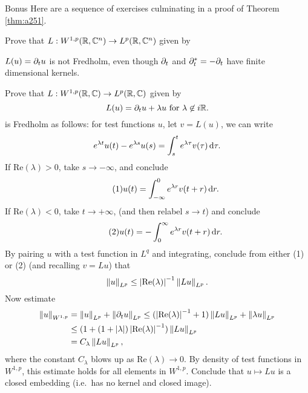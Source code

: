 \documentclass{amsart}
\begin{document}
\begin{clear}{Bonus}
Here are a sequence of exercises culminating in a proof of Theorem \ref{thm:a251}.

\begin{xca}
  Prove that $L:W^{1,p}(\mathbb{R},\mathbb{C}^{n})\to L^{p}(\mathbb{R},\mathbb{C}^{n})$ given by

  $L(u)=\partial_{t}u$ is not Fredholm, even though $\partial_{t}$ and
  $\partial_{t}^{*}=-\partial_{t}$ have finite dimensional kernels. 
\end{xca}
\begin{xca}\label{xca:a252}
  Prove that $L:W^{1,p}(\mathbb{R},\mathbb{C})\to L^{p}(\mathbb{R},\mathbb{C})$ given by
  \begin{equation*}
    L(u)=\partial_{t}u+\lambda u\text{ for $\lambda\not\in i\mathbb{R}$}.
  \end{equation*}
  is Fredholm as follows: for test functions $u$, let $v=L(u)$, we can write
  \begin{equation*}
    e^{\lambda t}u(t)-e^{\lambda s}u(s)=\int_{s}^{t}e^{\lambda
      \tau}v(\tau)\,\mathrm{d} \tau.
  \end{equation*}
  If $\text{Re}(\lambda)>0$, take $s\to -\infty$, and conclude
  \begin{equation*}\tag{$1$}
    u(t)=\int_{-\infty}^{0}e^{\lambda r}v(t+r)\,\mathrm{d} r.
  \end{equation*}
  If $\text{Re}(\lambda)<0$, take $t\to+\infty$, (and then relabel $s\to t$) and conclude
  \begin{equation*}\tag{$2$}
    u(t)=-\int_{0}^{\infty}e^{\lambda r}v(t+r)\,\mathrm{d} r.
  \end{equation*}
  By pairing $u$ with a test function in $L^{q}$ and integrating,
  conclude from either (1) or (2) (and recalling $v=Lu$) that
  \begin{equation*}
    \left\lVert u\right\rVert_{L^{p}}\le \left|\text{Re}(\lambda)\right|^{-1}\left\lVert Lu\right\rVert_{L^{p}}.
  \end{equation*}
  Now estimate
  \begin{equation*}
    \begin{aligned}
      \left\lVert u\right\rVert_{W^{1,p}}&=\left\lVert u\right\rVert_{L^{p}}+\left\lVert\partial_{t}u\right\rVert_{L^{p}}\le
      (\left|\text{Re}(\lambda)\right|^{-1}+1)\left\lVert Lu\right\rVert_{L^{p}}+\left\lVert\lambda
        u\right\rVert_{L^{p}}\\
      &\le (1+(1+\left|\lambda\right|)
      \left|\text{Re}(\lambda)\right|^{-1})\left\lVert Lu\right\rVert_{L^{p}}\\
      &=C_{\lambda}\left\lVert Lu\right\rVert_{L^{p}},
    \end{aligned}    
  \end{equation*}
  where the constant $C_{\lambda}$ blows up as
  $\text{Re}(\lambda)\to 0$. By density of test functions in
  $W^{1,p}$, this estimate holds for all elements in
  $W^{1,p}$. Conclude that $u\mapsto Lu$ is a closed embedding (i.e.\
  has no kernel and closed image).


\end{xca}
\end{clear}
\end{document}
